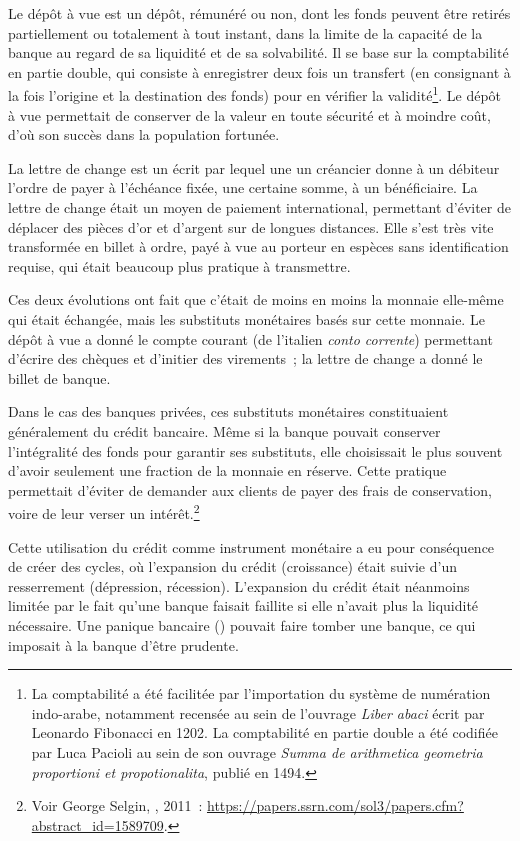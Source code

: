 Le dépôt à vue est un dépôt, rémunéré ou non, dont les fonds peuvent être retirés partiellement ou totalement à tout instant, dans la limite de la capacité de la banque au regard de sa liquidité et de sa solvabilité. Il se base sur la comptabilité en partie double, qui consiste à enregistrer deux fois un transfert (en consignant à la fois l'origine et la destination des fonds) pour en vérifier la validité\footnote{La comptabilité a été facilitée par l'importation du système de numération indo-arabe, notamment recensée au sein de l'ouvrage \emph{Liber abaci} écrit par Leonardo Fibonacci en 1202. La comptabilité en partie double a été codifiée par Luca Pacioli au sein de son ouvrage \emph{Summa de arithmetica geometria proportioni et propotionalita}, publié en 1494.}. Le dépôt à vue permettait de conserver de la valeur en toute sécurité et à moindre coût, d'où son succès dans la population fortunée.

La lettre de change est un écrit par lequel une un créancier donne à un débiteur l'ordre de payer à l'échéance fixée, une certaine somme, à un bénéficiaire. La lettre de change était un moyen de paiement international, permettant d'éviter de déplacer des pièces d'or et d'argent sur de longues distances. Elle s'est très vite transformée en billet à ordre, payé à vue au porteur en espèces sans identification requise, qui était beaucoup plus pratique à transmettre.

Ces deux évolutions ont fait que c'était de moins en moins la monnaie elle-même qui était échangée, mais les substituts monétaires basés sur cette monnaie. Le dépôt à vue a donné le compte courant (de l'italien \emph{conto corrente}) permettant d'écrire des chèques et d'initier des virements~; la lettre de change a donné le billet de banque.

Dans le cas des banques privées, ces substituts monétaires constituaient généralement du crédit bancaire. Même si la banque pouvait conserver l'intégralité des fonds pour garantir ses substituts, elle choisissait le plus souvent d'avoir seulement une fraction de la monnaie en réserve. Cette pratique permettait d'éviter de demander aux clients de payer des frais de conservation, voire de leur verser un intérêt.\footnote{Voir George Selgin, , 2011~: \url{https://papers.ssrn.com/sol3/papers.cfm?abstract_id=1589709}.}

Cette utilisation du crédit comme instrument monétaire a eu pour conséquence de créer des cycles, où l'expansion du crédit (croissance) était suivie d'un resserrement (dépression, récession). L'expansion du crédit était néanmoins limitée par le fait qu'une banque faisait faillite si elle n'avait plus la liquidité nécessaire. Une panique bancaire () pouvait faire tomber une banque, ce qui imposait à la banque d'être prudente.


